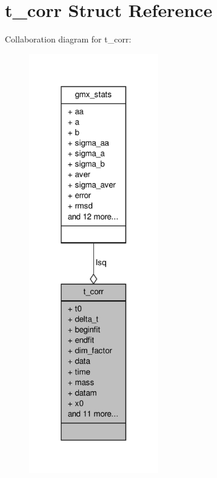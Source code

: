 \hypertarget{structt__corr}{\section{t\-\_\-corr \-Struct \-Reference}
\label{structt__corr}
}


\-Collaboration diagram for t\-\_\-corr\-:
\nopagebreak
\begin{figure}[H]
\begin{center}
\leavevmode
\includegraphics[width=160pt]{structt__corr__coll__graph}
\end{center}
\end{figure}
